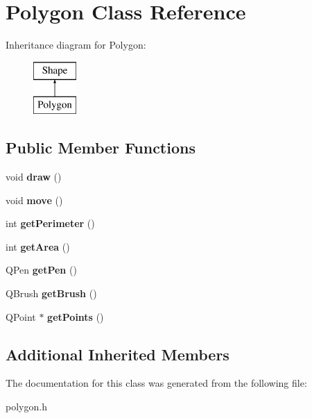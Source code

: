 \hypertarget{class_polygon}{}\section{Polygon Class Reference}
\label{class_polygon}
Inheritance diagram for Polygon\+:\begin{figure}[H]
\begin{center}
\leavevmode
\includegraphics[height=2.000000cm]{class_polygon}
\end{center}
\end{figure}
\subsection*{Public Member Functions}
\begin{DoxyCompactItemize}
\item 
\mbox{\label{class_polygon_a17428a7d7dff4653c905b91020a9f803}} 
void {\bfseries draw} ()
\item 
\mbox{\label{class_polygon_ad2931f86bb11263a87027b4ea9002e98}} 
void {\bfseries move} ()
\item 
\mbox{\label{class_polygon_a134c393d322723057d62e2ad85c73885}} 
int {\bfseries get\+Perimeter} ()
\item 
\mbox{\label{class_polygon_a392d9f070fee280614eaa5b702d06537}} 
int {\bfseries get\+Area} ()
\item 
\mbox{\label{class_polygon_a398faa5ff795637a7a02b8bc78b40356}} 
Q\+Pen {\bfseries get\+Pen} ()
\item 
\mbox{\label{class_polygon_af10e35bb2d7eb19c471b501e733fda5a}} 
Q\+Brush {\bfseries get\+Brush} ()
\item 
\mbox{\label{class_polygon_a2a6e9a2acc12944ad2e70c61d3479efa}} 
Q\+Point $\ast$ {\bfseries get\+Points} ()
\end{DoxyCompactItemize}
\subsection*{Additional Inherited Members}


The documentation for this class was generated from the following file\+:\begin{DoxyCompactItemize}
\item 
polygon.\+h\end{DoxyCompactItemize}
